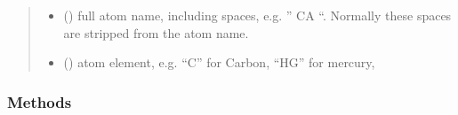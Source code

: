 \documentclass[a4paper,10pt,english,openany,oneside]{sphinxmanual}
\begin{document}
\begin{fulllineitems}
\begin{fulllineitems}
\begin{quote}
\begin{description}
\begin{itemize}
\item {} 
 () \textendash{} full atom name, including spaces, e.g. ” CA “. Normally
these spaces are stripped from the atom name.

\item {} 
 (\sphinxstyleliteralemphasis{\sphinxupquote{)}}) \textendash{} atom element, e.g. “C” for Carbon, “HG” for mercury,

\end{itemize}

\end{description}\end{quote}
\subsubsection*{Methods}


\begin{savenotes}\sphinxatlongtablestart\begin{longtable}{}
\hline

\endfirsthead

%
{}\\
\hline

\endhead

\hline
{}\\
\endfoot

\endlastfoot


\end{longtable}
\end{savenotes}
\end{fulllineitems}
\end{fulllineitems}
\end{document}
